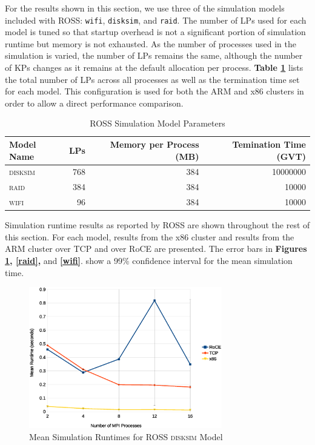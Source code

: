 \documentclass[11pt]{book}
\begin{document}
For the results shown in this section, we use three of the simulation models
included with ROSS: \verb;wifi;, \verb;disksim;, and \verb;raid;. The number of
LPs used for each model is tuned so that startup overhead is not a significant
portion of simulation runtime but memory is not exhausted. As the number of
processes used in the simulation is varied, the number of LPs remains the same,
although the number of KPs changes as it remains at the default allocation per
process. \textbf{Table \ref{lptable}} lists the total number of LPs across all
processes as well as the termination time set for each model. This configuration
is used for both the ARM and x86 clusters in order to allow a direct performance
comparison.

\begin{table}
  \caption{ROSS Simulation Model Parameters}
  \label{lptable}
  \centering
  \begin{tabular}[c]{| l | r | r | r |}
    \hline
    Model Name & LPs & Memory per Process (MB) & Temination Time (GVT) \\ \hline
    \textsc{disksim} & 768 & 384 & 10000000 \\
    \textsc{raid} & 384 & 384 & 10000 \\
    \textsc{wifi} & 96 & 384 & 10000 \\
    \hline
  \end{tabular}
\end{table}

Simulation runtime results as reported by ROSS are shown throughout the rest of
this section. For each model, results from the x86 cluster and results from the
ARM cluster over TCP and over RoCE are presented. The error bars in
\textbf{Figures \ref{disksim}, \ref{raid},} and
\textbf{\ref{wifi}}. show a 99\% confidence interval for the mean simulation
time.

\begin{figure}
\centering
\includegraphics[width=0.75\textwidth]{disksim}
\caption{Mean Simulation Runtimes for ROSS \textsc{disksim} Model}
\label{disksim}
\end{figure}
\end{document}
